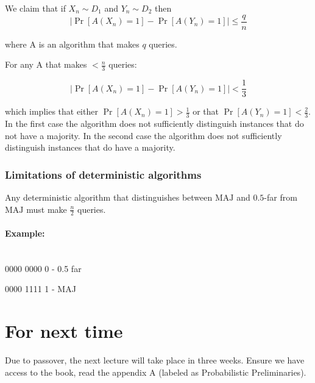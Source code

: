 \documentclass{idc_msc}
\begin{document}
We claim that if \(X_n \sim D_1\) and \(Y_n \sim D_2\) then
\[
  \left| \Pr[A(X_n) = 1] - \Pr[A(Y_n) = 1] \right| \le \frac{q}{n}
\]

where A is an algorithm that makes \(q\) queries.

For any A that makes \(< \frac{n}{3}\) queries:

\[
  \left| \Pr[A(X_n) = 1] - \Pr[A(Y_n) = 1] \right| < \frac{1}{3}
\]

which implies that either \(\Pr[A(X_n) = 1] > \frac{1}{3}\) or that \(\Pr[A(Y_n) = 1] < \frac{2}{3}\).
In the first case the algorithm does not sufficiently distinguish instances that do not have a majority.
In the second case the algorithm does not sufficiently distinguish instances that do have a majority.


\subsubsection{Limitations of deterministic algorithms}

Any deterministic algorithm that distinguishes between \(\mathrm{MAJ}\) and \(0.5\)-far from \(\mathrm{MAJ}\) must make \(\frac{n}{2}\) queries.

\paragraph{Example:}

\ \\

0000 0000 0 - 0.5 far

0000 1111 1 - MAJ


\section{For next time}

  Due to passover, the next lecture will take place in three weeks.
  Ensure we have access to the book\cite{goldreich2017introduction}, read the appendix A (labeled as Probabilistic Preliminaries).
\end{document}
